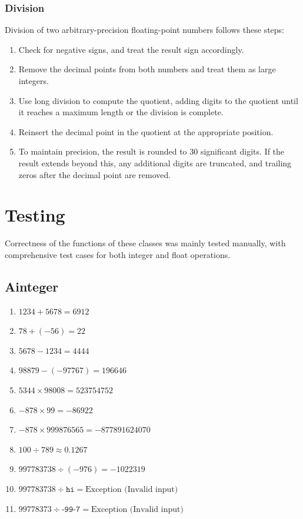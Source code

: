 \documentclass[12pt]{article}
\begin{document}
\subsubsection{Division}
Division of two arbitrary-precision floating-point numbers follows these steps:
\begin{enumerate}
    \item Check for negative signs, and treat the result sign accordingly.
    \item Remove the decimal points from both numbers and treat them as large integers.
    \item Use long division to compute the quotient, adding digits to the quotient until it reaches a maximum length or the division is complete.
    \item Reinsert the decimal point in the quotient at the appropriate position.
    \item To maintain precision, the result is rounded to 30 significant digits. If the result extends beyond this, any additional digits are truncated, and trailing zeros after the decimal point are removed.
\end{enumerate}

\section{Testing}

Correctness of the functions of these classes was mainly tested manually, with comprehensive test cases for both integer and float operations.
\subsection{Ainteger}
\begin{enumerate}
    \item \(1234 + 5678 = 6912\)
    \item \(78 + (-56) = 22\)
    \item \(5678 - 1234 = 4444\)
    \item \(98879 - (-97767) = 196646\)
    \item \(5344 \times 98008 = 523754752\)
    \item \(-878 \times 99 = -86922\)
    \item \(-878 \times 999876565 = -877891624070\)
    \item \(100 \div 789 \approx 0.1267\)
    \item \(997783738 \div (-976) = -1022319\)
    \item \(997783738 \div \texttt{hi} = \text{Exception (Invalid input)}\)
    \item \(99778373 \div \texttt{-99-7} = \text{Exception (Invalid input)}\)

\end{enumerate}
\end{document}
